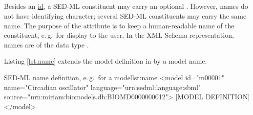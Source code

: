 \subsection{}
\label{sec:name}
%

Besides an \hyperref[sec:id]{id}, a SED-ML constituent may carry an optional . However, names do not have identifying character;  several SED-ML constituents may carry the same name. The purpose of the  attribute is to keep a human-readable name of the constituent, e.\,g.\ for display to the user. In the XML Schema representation, names are of the data type .

Listing \ref{lst:name} extends the model definition in  by a model name.
%
\begin{myXmlLst}{SED-ML name definition, e.\,g.\ for a model}{lst:name}
<model id="m00001" name="Circadian oscillator" language="urn:sedml:language:sbml" source="urn:miriam:biomodels.db:BIOMD0000000012">
 [MODEL DEFINITION]
</model>
\end{myXmlLst}
%

